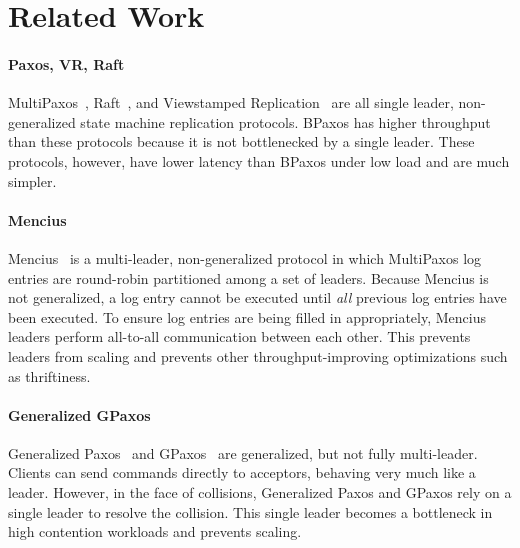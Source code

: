 \section{Related Work}

\paragraph{Paxos, VR, Raft}
MultiPaxos~\cite{lamport1998part, lamport2001paxos, van2015paxos,
lampson2001abcd, mazieres2007paxos}, Raft~\cite{mazieres2007paxos}, and
Viewstamped Replication~\cite{liskov2012viewstamped} are all single leader,
non-generalized state machine replication protocols. BPaxos has higher
throughput than these protocols because it is not bottlenecked by a single
leader. These protocols, however, have lower latency than BPaxos under low load
and are much simpler.

\paragraph{Mencius}
Mencius~\cite{mao2008mencius} is a multi-leader, non-generalized protocol in
which MultiPaxos log entries are round-robin partitioned among a set of
leaders. Because Mencius is not generalized, a log entry cannot be executed
until \emph{all} previous log entries have been executed. To ensure log entries
are being filled in appropriately, Mencius leaders perform all-to-all
communication between each other. This prevents leaders from scaling and
prevents other throughput-improving optimizations such as thriftiness.

\paragraph{Generalized GPaxos}
Generalized Paxos~\cite{lamport2005generalized} and GPaxos~\cite{sutra2011fast}
are generalized, but not fully multi-leader. Clients can send commands directly
to acceptors, behaving very much like a leader. However, in the face of
collisions, Generalized Paxos and GPaxos rely on a single leader to resolve the
collision. This single leader becomes a bottleneck in high contention workloads
and prevents scaling.

